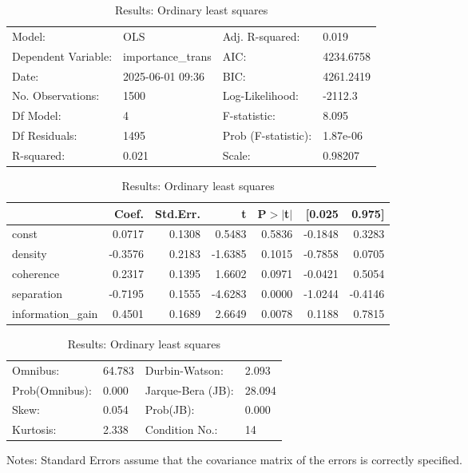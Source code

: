 \begin{table}
\caption{Results: Ordinary least squares}
\label{}
\begin{center}
\begin{tabular}{llll}
\hline
Model:              & OLS               & Adj. R-squared:     & 0.019      \\
Dependent Variable: & importance\_trans & AIC:                & 4234.6758  \\
Date:               & 2025-06-01 09:36  & BIC:                & 4261.2419  \\
No. Observations:   & 1500              & Log-Likelihood:     & -2112.3    \\
Df Model:           & 4                 & F-statistic:        & 8.095      \\
Df Residuals:       & 1495              & Prob (F-statistic): & 1.87e-06   \\
R-squared:          & 0.021             & Scale:              & 0.98207    \\
\hline
\end{tabular}
\end{center}

\begin{center}
\begin{tabular}{lrrrrrr}
\hline
                  &   Coef. & Std.Err. &       t & P$> |$t$|$ &  [0.025 &  0.975]  \\
\hline
const             &  0.0717 &   0.1308 &  0.5483 &      0.5836 & -0.1848 &  0.3283  \\
density           & -0.3576 &   0.2183 & -1.6385 &      0.1015 & -0.7858 &  0.0705  \\
coherence         &  0.2317 &   0.1395 &  1.6602 &      0.0971 & -0.0421 &  0.5054  \\
separation        & -0.7195 &   0.1555 & -4.6283 &      0.0000 & -1.0244 & -0.4146  \\
information\_gain &  0.4501 &   0.1689 &  2.6649 &      0.0078 &  0.1188 &  0.7815  \\
\hline
\end{tabular}
\end{center}

\begin{center}
\begin{tabular}{llll}
\hline
Omnibus:       & 64.783 & Durbin-Watson:    & 2.093   \\
Prob(Omnibus): & 0.000  & Jarque-Bera (JB): & 28.094  \\
Skew:          & 0.054  & Prob(JB):         & 0.000   \\
Kurtosis:      & 2.338  & Condition No.:    & 14      \\
\hline
\end{tabular}
\end{center}
\end{table}
\bigskip
Notes: \newline 
[1] Standard Errors assume that the covariance matrix of the errors is correctly specified.